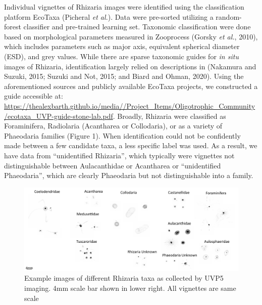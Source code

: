 \documentclass[
]{article}
\begin{document}
Individual vignettes of Rhizaria images were identified using the
classification platform EcoTaxa (Picheral \emph{et al.}). Data were
pre-sorted utilizing a random-forest classifier and pre-trained learning
set. Taxonomic classification were done based on morphological
parameters measured in Zooprocess (Gorsky \emph{et al.}, 2010), which
includes parameters such as major axis, equivalent spherical diameter
(ESD), and grey values. While there are sparse taxonomic guides for
\emph{in situ} images of Rhizaria, identification largely relied on
descriptions in (Nakamura and Suzuki, 2015; Suzuki and Not, 2015; and
Biard and Ohman, 2020). Using the aforementioned sources and publicly
available EcoTaxa projects, we constructed a guide accessible at:
\url{https://thealexbarth.github.io/media//Project_Items/Oligotrophic_Community/ecotaxa_UVP-guide-stone-lab.pdf}.
Broadly, Rhizaria were classified as Foraminifera, Radiolaria
(Acantharea or Collodaria), or as a variety of Phaeodaria families
(Figure 1). When identification could not be confidently made between a
few candidate taxa, a less specific label was used. As a result, we have
data from ``unidentified Rhizaria'', which typically were vignettes not
distinguishable between Aulacanthidae or Acantharea or ``unidentified
Phaeodaria'', which are clearly Phaeodaria but not distinguishable into
a family.

\begin{figure}

{\centering \includegraphics{images/01_taxa.pdf}

}

\caption{Example images of different Rhizaria taxa as collected by UVP5
imaging. 4mm scale bar shown in lower right. All vignettes are same
scale}

\end{figure}
\end{document}

